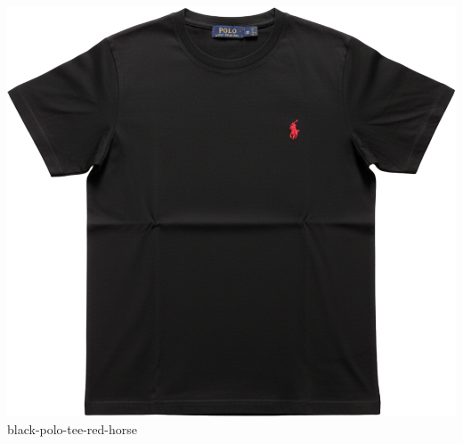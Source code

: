 \documentclass[10pt]{article}
\begin{document}
\begin{minipage}[t]{0.22\textwidth}\centering\vspace{0mm}
\includegraphics[width=\linewidth,keepaspectratio]{assets/tees/black-polo-tee-red-horse.png}\\
\vspace{0.5mm}\tiny black-polo-tee-red-horse\end{minipage}
\newpage
\end{document}
